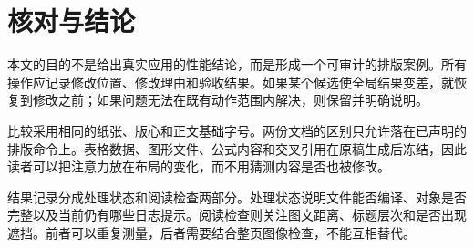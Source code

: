 \documentclass[UTF8,10pt,a4paper,fontset=windows]{ctexart}
\begin{document}
\section{核对与结论}
本文的目的不是给出真实应用的性能结论，而是形成一个可审计的排版案例。所有操作应记录修改位置、修改理由和验收结果。如果某个候选使全局结果变差，就恢复到修改之前；如果问题无法在既有动作范围内解决，则保留并明确说明。

比较采用相同的纸张、版心和正文基础字号。两份文档的区别只允许落在已声明的排版命令上。表格数据、图形文件、公式内容和交叉引用在原稿生成后冻结，因此读者可以把注意力放在布局的变化，而不用猜测内容是否也被修改。

结果记录分成处理状态和阅读检查两部分。处理状态说明文件能否编译、对象是否完整以及当前仍有哪些日志提示。阅读检查则关注图文距离、标题层次和是否出现遮挡。前者可以重复测量，后者需要结合整页图像检查，不能互相替代。
\end{document}
